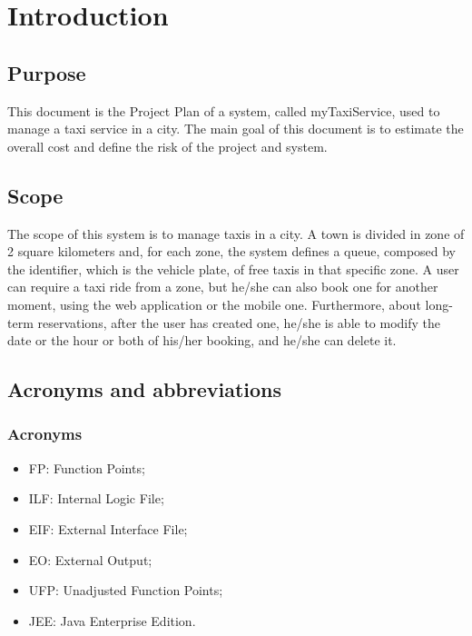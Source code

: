 \section{Introduction}
\subsection{Purpose}
	This document is the Project Plan of a system, called myTaxiService, used to manage  a taxi service in a city. The main goal of this document is to estimate the overall cost and define the risk of the project and system.
\subsection{Scope}
	The scope of this system is to manage taxis in a city. A town is divided in zone of 2 square kilometers and, for each zone, the system defines a queue, composed by the identifier, which is the vehicle plate, of free taxis in that specific zone. A user can require a taxi ride from a zone, but he/she can also book one for another moment, using the web application or the mobile one. Furthermore, about long-term reservations, after the user has created one, he/she is able to modify the date or the hour or both of his/her booking, and he/she can delete it. 
\subsection{Acronyms and abbreviations}
	\subsubsection{Acronyms}
		\begin{itemize}
			\item FP: Function Points;
			\item ILF: Internal Logic File;
			\item EIF: External Interface File;
			\item EO: External Output;
			\item UFP: Unadjusted Function Points;
			\item JEE: Java Enterprise Edition.
		\end{itemize}
